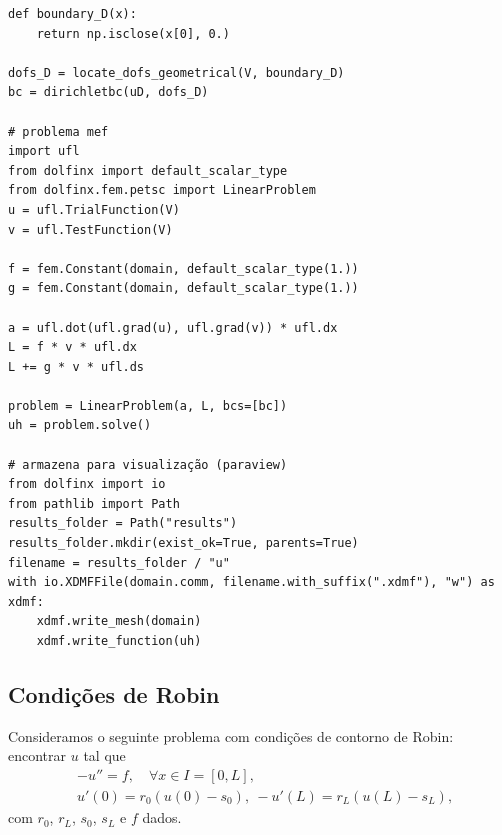\begin{ex}
\begin{lstlisting}[caption=ex\_mef1d\_neumann\_nh.py]
def boundary_D(x):
    return np.isclose(x[0], 0.)

dofs_D = locate_dofs_geometrical(V, boundary_D)
bc = dirichletbc(uD, dofs_D)

# problema mef
import ufl
from dolfinx import default_scalar_type
from dolfinx.fem.petsc import LinearProblem
u = ufl.TrialFunction(V)
v = ufl.TestFunction(V)

f = fem.Constant(domain, default_scalar_type(1.))
g = fem.Constant(domain, default_scalar_type(1.))

a = ufl.dot(ufl.grad(u), ufl.grad(v)) * ufl.dx
L = f * v * ufl.dx
L += g * v * ufl.ds

problem = LinearProblem(a, L, bcs=[bc])
uh = problem.solve()

# armazena para visualização (paraview)
from dolfinx import io
from pathlib import Path
results_folder = Path("results")
results_folder.mkdir(exist_ok=True, parents=True)
filename = results_folder / "u"
with io.XDMFFile(domain.comm, filename.with_suffix(".xdmf"), "w") as xdmf:
    xdmf.write_mesh(domain)
    xdmf.write_function(uh)
\end{lstlisting}

\end{ex} 

\subsection{Condições de Robin}

Consideramos o seguinte problema com condições de contorno de Robin{\robin}: encontrar $u$ tal que
\begin{align}
  &-u'' = f,\quad \forall x\in I=[0, L],\label{eq:cc_r_eq}\\
  &u'(0) = r_0(u(0)-s_0),~ -u'(L) = r_L(u(L)-s_L),\label{eq:cc_r_bc}
\end{align}
com $r_0$, $r_L$, $s_0$, $s_L$ e $f$ dados.

